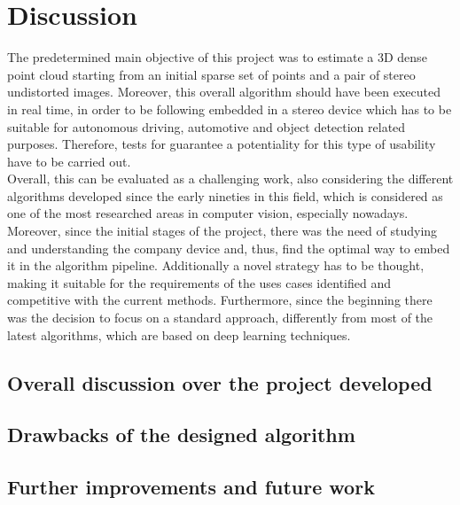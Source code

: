 \chapter{Discussion}
\label{chapter:discussion}

The predetermined main objective of this project was to estimate a 3D dense point cloud starting from an initial sparse set of points and a pair of stereo undistorted images.
Moreover, this overall algorithm should have been executed in real time, in order to be following embedded in a stereo device which has to be suitable for autonomous driving, automotive and object detection related purposes.
Therefore, tests for guarantee a potentiality for this type of usability have to be carried out. \\
Overall, this can be evaluated as a challenging work, also considering the different algorithms developed since the early nineties in this field, which is considered as one of the most researched areas in computer vision, especially nowadays.\\
Moreover, since the initial stages of the project, there was the need of studying and understanding the company device and, thus, find the optimal way to embed it in the algorithm pipeline.
Additionally a novel strategy has to be thought, making it suitable for the requirements of the uses cases identified and competitive with the current methods.
Furthermore, since the beginning there was the decision to focus on a standard approach, differently from most of the latest algorithms, which are based on deep learning techniques.  

\section{Overall discussion over the project developed}
\label{section:overall-discussion}


\section{Drawbacks of the designed algorithm}
\label{section:algorithm-drawbacks}


\section{Further improvements and future work}
\label{section:further-improvements}



